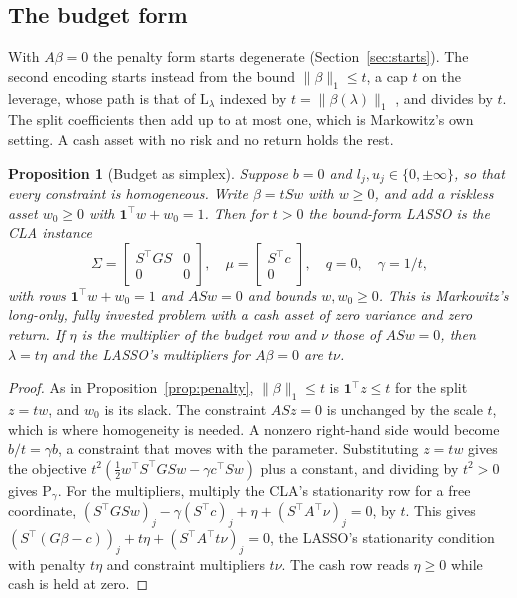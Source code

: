 \documentclass[11pt]{article}
\newtheorem{proposition}{Proposition}
\theoremstyle{remark}
\newcommand{\trans}{^{\top}}
\newcommand{\Sig}{\Sigma}
\newcommand{\one}{\mathbf{1}}
\begin{document}
\subsection{The budget form}
\label{sec:budget}

With $A\beta=0$ the penalty form starts degenerate (Section~\ref{sec:starts}). The
second encoding starts instead from the bound $\|\beta\|_1\le t$, a cap $t$ on the
leverage, whose path is that
of $\mathrm{L}_\lambda$ indexed by $t=\|\beta(\lambda)\|_1$ \cite[Theorem~1]{perspective},
and divides by $t$. The split coefficients then add up to at most one, which is
Markowitz's own setting. A cash asset with no risk and no return holds the rest.

\begin{proposition}[Budget as simplex]
\label{prop:budget}
Suppose $b=0$ and $l_j,u_j\in\{0,\pm\infty\}$, so that every constraint is homogeneous.
Write $\beta=tSw$ with $w\ge0$, and add a riskless asset $w_0\ge0$ with
$\one\trans w+w_0=1$. Then for $t>0$ the bound-form LASSO is the CLA instance
\[
\Sig=\begin{bmatrix}S\trans GS&0\\0&0\end{bmatrix},\quad
\mu=\begin{bmatrix}S\trans c\\0\end{bmatrix},\quad q=0,\quad \gamma=1/t,
\]
with rows $\one\trans w+w_0=1$ and $ASw=0$ and bounds $w,w_0\ge0$. This is
Markowitz's long-only, fully invested problem with a cash asset of zero variance and
zero return. If $\eta$ is the multiplier of the budget row and $\nu$ those of
$ASw=0$, then $\lambda=t\eta$ and the LASSO's multipliers for $A\beta=0$ are $t\nu$.
\end{proposition}

\begin{proof}
As in Proposition~\ref{prop:penalty}, $\|\beta\|_1\le t$ is $\one\trans z\le t$ for the
split $z=tw$, and $w_0$ is its slack. The constraint $ASz=0$ is unchanged by the scale
$t$, which is where homogeneity is needed. A nonzero right-hand side would become
$b/t=\gamma b$, a constraint that moves with the parameter. Substituting $z=tw$ gives the
objective $t^2(\tfrac12w\trans S\trans GSw-\gamma c\trans Sw)$ plus a constant, and
dividing by $t^2>0$ gives $\mathrm{P}_\gamma$. For the multipliers, multiply the CLA's
stationarity row for a free coordinate,
$(S\trans GSw)_j-\gamma(S\trans c)_j+\eta+(S\trans A\trans\nu)_j=0$, by $t$. This gives
$(S\trans(G\beta-c))_j+t\eta+(S\trans A\trans t\nu)_j=0$, the LASSO's stationarity
condition with penalty $t\eta$ and constraint multipliers $t\nu$. The cash row reads
$\eta\ge0$ while cash is held at zero.
\end{proof}
\end{document}

